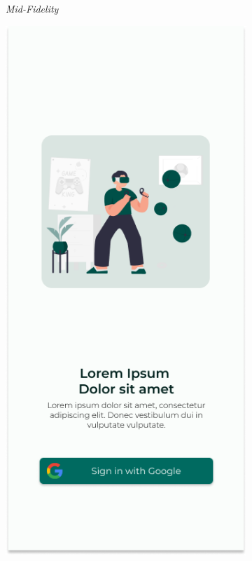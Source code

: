 \begin{figure}[H]
\begin{subfigure}[b]{0.3\textwidth}
	  \caption{\textit{Mid-Fidelity}}
	  \label{fig:midFi-login}
	\end{subfigure}
	\begin{subfigure}[b]{0.3\textwidth}
		\centering
	  \includegraphics[width=\linewidth]{contents/chapter-3/images/HF-login.png}

\end{subfigure}
\end{figure}
